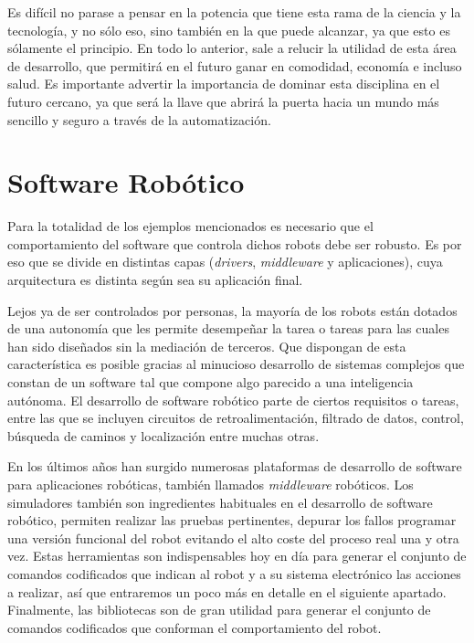 Es difícil no parase a pensar en la potencia que tiene esta rama de la ciencia y la tecnología, y no sólo eso, sino también en la que puede alcanzar, ya que esto es sólamente el principio. En todo lo anterior, sale a relucir la utilidad de esta área de desarrollo, que permitirá en el futuro ganar en comodidad, economía e incluso salud. Es importante advertir la importancia de dominar esta disciplina en el futuro cercano, ya que será la llave que abrirá la puerta hacia un mundo más sencillo y seguro a través de la automatización.

\section{Software Robótico} 
Para la totalidad de los ejemplos mencionados es necesario que el comportamiento del software que controla dichos robots debe ser robusto. Es por eso que se divide en distintas capas (\textit{drivers}, \textit{middleware} y aplicaciones), cuya arquitectura es distinta según sea su aplicación final.

Lejos ya de ser controlados por personas, la mayoría de los robots están dotados de una autonomía que les permite desempeñar la tarea o tareas para las cuales han sido diseñados sin la mediación de terceros. Que dispongan de esta característica es posible gracias al minucioso desarrollo de sistemas complejos que constan de un software tal que compone algo parecido a una inteligencia autónoma.
El desarrollo de software robótico parte de ciertos requisitos o tareas, entre las que se incluyen circuitos de retroalimentación, filtrado de datos, control, búsqueda de caminos y localización entre muchas otras. 

En los últimos años han surgido numerosas plataformas de desarrollo de software para aplicaciones robóticas, también llamados \textit{middleware} robóticos. Los simuladores también son ingredientes habituales en el desarrollo de software robótico, permiten realizar las pruebas pertinentes, depurar los fallos programar una versión funcional del robot evitando el alto coste del proceso real una y otra vez. Estas herramientas son indispensables hoy en día para generar el conjunto de comandos codificados que indican al robot y a su sistema electrónico las acciones a realizar, así que entraremos un poco más en detalle en el siguiente apartado. Finalmente, las bibliotecas son de gran utilidad para generar el conjunto de comandos codificados que conforman el comportamiento del robot.

